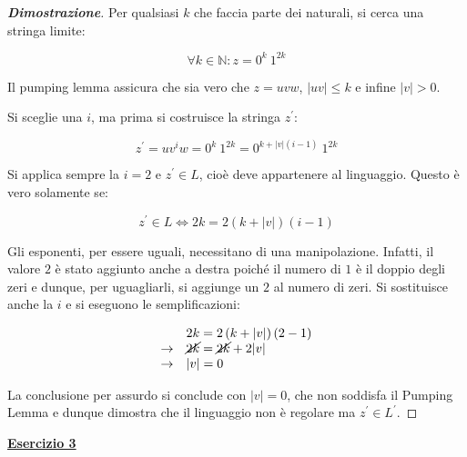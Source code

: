 \documentclass[a4paper]{article}
\begin{document}
	\begin{proof}[\textcolor{Blue3}{\textbf{Dimostrazione}}]
		Per qualsiasi $k$ che faccia parte dei naturali, si cerca una stringa limite:
		
		\begin{equation*}
			\forall k \in \mathbb{N} : z = 0^{k} \: 1^{2k}
		\end{equation*}
	
		\noindent
		Il pumping lemma assicura che sia vero che $z = uvw$, $|uv| \le k$ e infine $|v| > 0$.\newline
		
		\noindent
		Si sceglie una $i$, ma prima si costruisce la stringa $z^{'}$:
		
		\begin{equation*}
			z^{'} = u v^{i} w = 0^{k} \: 1^{2k} = 0^{k + |v|\left(i-1\right)} \: 1^{2k}
		\end{equation*}
	
		\noindent
		Si applica sempre la $i = 2$ e $z^{'} \in L$, cioè deve appartenere al linguaggio. Questo è vero solamente se:
		
		\begin{equation*}
			z^{'} \in L \iff 2k = 2 \left(k+|v|\right)\left(i-1\right)
		\end{equation*}
		
		\noindent
		Gli esponenti, per essere uguali, necessitano di una manipolazione. Infatti, il valore $2$ è stato aggiunto anche a destra poiché il numero di $1$ è il doppio degli zeri e dunque, per uguagliarli, si aggiunge un $2$ al numero di zeri. Si sostituisce anche la $i$ e si eseguono le semplificazioni:
		
		\begin{equation*}
			\begin{array}{cl}
				& 2k = 2 \left(k+|v|\right)\left(2-1\right) \\
				\rightarrow & \cancel{2k} = \cancel{2k} + 2 |v| \\
				\rightarrow & |v| = 0
			\end{array}
		\end{equation*}
	
		\noindent
		La conclusione per assurdo si conclude con $|v| = 0$, che non soddisfa il Pumping Lemma e dunque dimostra che il linguaggio non è regolare ma $z^{'} \in L^{'}$.
	\end{proof}

	\newpage
	
	\noindent
	\textcolor{Red3}{\textbf{\underline{Esercizio 3}}}\newline
	
\end{document}
